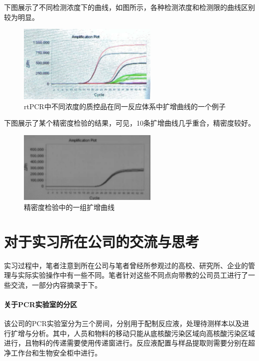 \documentclass[cn,black,12pt,normal]{elegantnote}
\begin{document}
下图展示了不同检测浓度下的曲线，如图所示，各种检测浓度和检测限的曲线区别较为明显。
\begin{figure}[H]
    \centering
    \includegraphics[width=0.6\textwidth]{image/WechatIMG28.jpeg}
    \caption{rtPCR中不同浓度的质控品在同一反应体系中扩增曲线的一个例子}
    \label{rtres}
\end{figure}

下图展示了某个精密度检验的结果，可见，10条扩增曲线几乎重合，精密度较好。
\begin{figure}[H]
    \centering
    \includegraphics[width=0.6\textwidth]{image/WechatIMG29.jpeg}
    \caption{精密度检验中的一组扩增曲线}
    \label{rtres}
\end{figure}





\section{对于实习所在公司的交流与思考}

实习过程中，笔者注意到所在公司与笔者曾经所参观过的高校、研究所、企业的管理与实际实验操作中有一些不同。笔者针对这些不同点向带教的公司员工进行了一些交流，一部分内容摘录于下。

\paragraph{关于PCR实验室的分区} 该公司的PCR实验室分为三个房间，分别用于配制反应液，处理待测样本以及进行扩增与分析。其中，人员和物料的移动只能从底核酸污染区域向高核酸污染区域进行，且物料的传递需要使用传递窗进行。反应液配置与样品提取则需要分别在超净工作台和生物安全柜中进行。
\end{document}
